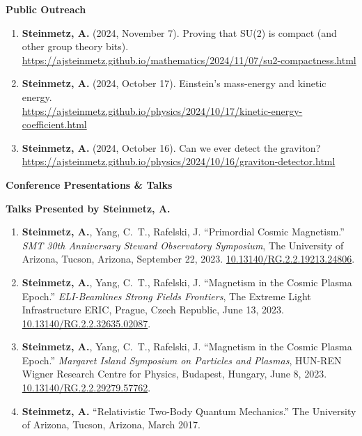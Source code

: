 \documentclass[11pt]{article}
\begin{document}
\medskip

{\large\textbf{Public Outreach}}

\begin{enumerate}[leftmargin=*,nosep]
    \item \textbf{Steinmetz, A.} (2024, November 7). Proving that SU(2) is compact (and other group theory bits). \href{https://ajsteinmetz.github.io/mathematics/2024/11/07/su2-compactness.html}{https://ajsteinmetz.github.io/mathematics/2024/11/07/su2-compactness.html}
    \item \textbf{Steinmetz, A.} (2024, October 17). Einstein’s mass-energy and kinetic energy. \\ \href{https://ajsteinmetz.github.io/physics/2024/10/17/kinetic-energy-coefficient.html}{https://ajsteinmetz.github.io/physics/2024/10/17/kinetic-energy-coefficient.html}
    \item \textbf{Steinmetz, A.} (2024, October 16). Can we ever detect the graviton?\\ \href{https://ajsteinmetz.github.io/physics/2024/10/16/graviton-detector.html}{https://ajsteinmetz.github.io/physics/2024/10/16/graviton-detector.html}
\end{enumerate}

\medskip

{\Large\textbf{Conference Presentations \& Talks}}

{\large\textbf{Talks Presented by Steinmetz, A.}}

\begin{enumerate}[leftmargin=*,nosep]
    \item \textbf{Steinmetz, A.}, Yang, C.~T., Rafelski, J. ``Primordial Cosmic Magnetism.'' \textit{SMT 30th Anniversary Steward Observatory Symposium}, The University of Arizona, Tucson, Arizona, September 22, 2023. \href{http://dx.doi.org/10.13140/RG.2.2.19213.24806}{10.13140/RG.2.2.19213.24806}.
    \item \textbf{Steinmetz, A.}, Yang, C.~T., Rafelski, J. ``Magnetism in the Cosmic Plasma Epoch.'' \textit{ELI-Beamlines Strong Fields Frontiers}, The Extreme Light Infrastructure ERIC, Prague, Czech Republic, June 13, 2023. \href{http://dx.doi.org/10.13140/RG.2.2.32635.02087}{10.13140/RG.2.2.32635.02087}.
    \item \textbf{Steinmetz, A.}, Yang, C.~T., Rafelski, J. ``Magnetism in the Cosmic Plasma Epoch.'' \textit{Margaret Island Symposium on Particles and Plasmas}, HUN-REN Wigner Research Centre for Physics, Budapest, Hungary, June 8, 2023. \href{http://dx.doi.org/10.13140/RG.2.2.29279.57762}{10.13140/RG.2.2.29279.57762}.
    \item \textbf{Steinmetz, A.} ``Relativistic Two-Body Quantum Mechanics.'' The University of Arizona, Tucson, Arizona, March 2017.
\end{enumerate}
\end{document}
